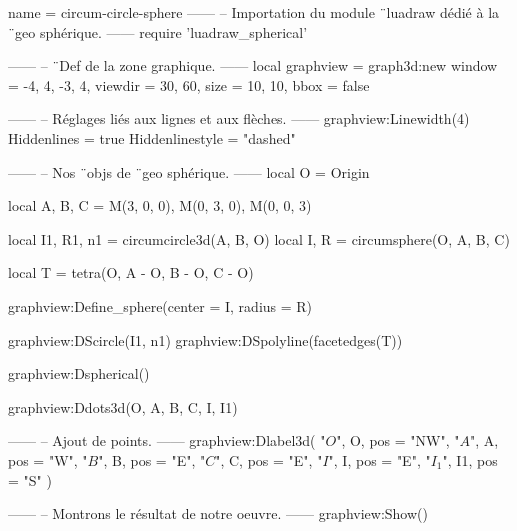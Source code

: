\documentclass[border = 3pt]{standalone}
\begin{document}
\begin{luadraw}{name = circum-circle-sphere}
------
-- Importation du module ¨luadraw dédié à la ¨geo sphérique.
------
require 'luadraw_spherical'

------
-- ¨Def de la zone graphique.
------
local graphview = graph3d:new{
  window  = {-4, 4, -3, 4},
  viewdir = {30, 60},
  size    = {10, 10},
  bbox    = false
}

------
-- Réglages liés aux lignes et aux flèches.
------
graphview:Linewidth(4)
Hiddenlines     = true
Hiddenlinestyle = "dashed"

------
-- Nos ¨objs de ¨geo sphérique.
------
local O = Origin

local A, B, C = M(3, 0, 0), M(0, 3, 0), M(0, 0, 3)

local I1, R1, n1 = circumcircle3d(A, B, O)
local I, R       = circumsphere(O, A, B, C)

local T = tetra(O, A - O, B - O, C - O)

graphview:Define_sphere({center = I, radius = R})

graphview:DScircle({I1, n1})
graphview:DSpolyline(facetedges(T))

graphview:Dspherical()

graphview:Ddots3d({O, A, B, C, I, I1})

------
-- Ajout de points.
------
graphview:Dlabel3d(
  "$O$", O, {pos = "NW"},
  "$A$", A, {pos = "W"},
  "$B$", B, {pos = "E"},
  "$C$", C, {pos = "E"},
  "$I$", I, {pos = "E"},
  "$I_1$", I1, {pos = "S"}
)

------
-- Montrons le résultat de notre oeuvre.
------
graphview:Show()
\end{luadraw}
\end{document}
